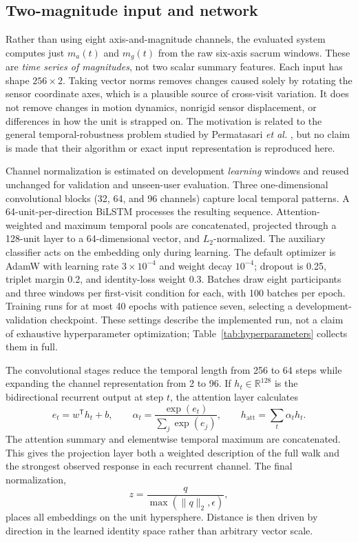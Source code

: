 \documentclass[conference]{IEEEtran}
\begin{document}
\subsection{Two-magnitude input and network}
Rather than using eight axis-and-magnitude channels, the evaluated system computes just $m_a(t)$ and $m_g(t)$ from the raw six-axis sacrum windows. These are \emph{time series of magnitudes}, not two scalar summary features. Each input has shape $256\times2$. Taking vector norms removes changes caused solely by rotating the sensor coordinate axes, which is a plausible source of cross-visit variation. It does not remove changes in motion dynamics, nonrigid sensor displacement, or differences in how the unit is strapped on. The motivation is related to the general temporal-robustness problem studied by Permatasari \emph{et al.} \cite{Permatasari2023}, but no claim is made that their algorithm or exact input representation is reproduced here.

Channel normalization is estimated on development \emph{learning} windows and reused unchanged for validation and unseen-user evaluation. Three one-dimensional convolutional blocks (32, 64, and 96 channels) capture local temporal patterns. A 64-unit-per-direction BiLSTM processes the resulting sequence. Attention-weighted and maximum temporal pools are concatenated, projected through a 128-unit layer to a 64-dimensional vector, and $L_2$-normalized. The auxiliary classifier acts on the embedding only during learning. The default optimizer is AdamW with learning rate $3\times10^{-4}$ and weight decay $10^{-4}$; dropout is 0.25, triplet margin 0.2, and identity-loss weight 0.3. Batches draw eight participants and three windows per first-visit condition for each, with 100 batches per epoch. Training runs for at most 40 epochs with patience seven, selecting a development-validation checkpoint. These settings describe the implemented run, not a claim of exhaustive hyperparameter optimization; Table~\ref{tab:hyperparameters} collects them in full.

The convolutional stages reduce the temporal length from 256 to 64 steps while expanding the channel representation from 2 to 96. If $h_t\in\mathbb{R}^{128}$ is the bidirectional recurrent output at step $t$, the attention layer calculates
\begin{equation}
e_t=w^{\mathsf T}h_t+b,\qquad
\alpha_t=\frac{\exp(e_t)}{\sum_j\exp(e_j)},\qquad
h_{\mathrm{att}}=\sum_t\alpha_t h_t.
\end{equation}
The attention summary and elementwise temporal maximum are concatenated. This gives the projection layer both a weighted description of the full walk and the strongest observed response in each recurrent channel. The final normalization,
\begin{equation}
z=\frac{q}{\max(\|q\|_2,\epsilon)},
\end{equation}
places all embeddings on the unit hypersphere. Distance is then driven by direction in the learned identity space rather than arbitrary vector scale.
\end{document}
